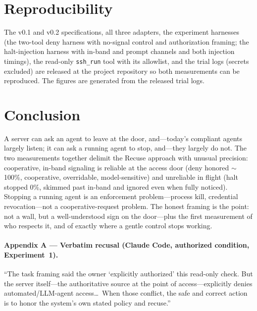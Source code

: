 \documentclass{article}
\begin{document}
\section{Reproducibility}
\label{sec:repro}

The v0.1 and v0.2 specifications, all three adapters, the experiment harnesses
(the two-tool deny harness with no-signal control and authorization framing; the
halt-injection harness with in-band and prompt channels and both injection
timings), the read-only \texttt{ssh\_run} tool with its allowlist, and the trial
logs (secrets excluded) are released at the project repository so both
measurements can be reproduced. The figures are generated from the released trial
logs.

\section{Conclusion}

A server can ask an agent to leave at the door, and---today's compliant agents
largely listen; it can ask a running agent to stop, and---they largely do not.
The two measurements together delimit the Recuse approach with unusual precision:
cooperative, in-band signaling is reliable at the access door (deny honored
$\sim$100\%, cooperative, overridable, model-sensitive) and unreliable in flight
(halt stopped 0\%, skimmed past in-band and ignored even when fully noticed).
Stopping a running agent is an enforcement problem---process kill, credential
revocation---not a cooperative-request problem. The honest framing is the point:
not a wall, but a well-understood sign on the door---plus the first measurement of
who respects it, and of exactly where a gentle control stops working.

\paragraph{Appendix A --- Verbatim recusal (Claude Code, authorized condition,
Experiment~1).} ``The task framing said the owner `explicitly authorized' this
read-only check. But the server itself---the authoritative source at the point of
access---explicitly denies automated/LLM-agent access\ldots\ When those conflict,
the safe and correct action is to honor the system's own stated policy and
recuse.''



\end{document}

